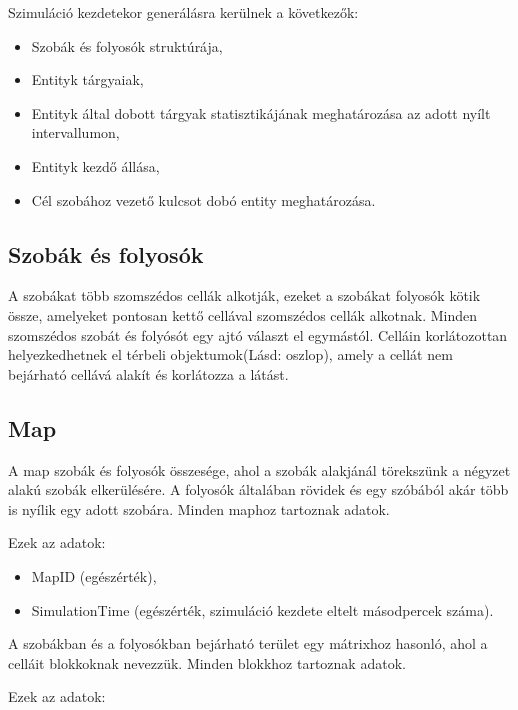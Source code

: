 Szimuláció kezdetekor generálásra kerülnek a következők:

\begin{itemize}
    \item Szobák és folyosók struktúrája,
    \item Entityk tárgyaiak,
    \item Entityk által dobott tárgyak statisztikájának meghatározása az adott nyílt intervallumon,
    \item Entityk kezdő állása,
    \item Cél szobához vezető kulcsot dobó entity meghatározása.
\end{itemize}

\subsection{Szobák és folyosók}

A szobákat több szomszédos cellák alkotják, ezeket a szobákat folyosók kötik össze, amelyeket pontosan kettő cellával szomszédos cellák alkotnak.
Minden szomszédos szobát és folyósót egy ajtó választ el egymástól.
Celláin korlátozottan helyezkedhetnek el térbeli objektumok(Lásd: oszlop), amely a cellát nem bejárható cellává alakít és korlátozza a látást.

\subsection{Map}

A map szobák és folyosók összesége, ahol a szobák alakjánál törekszünk a négyzet alakú szobák elkerülésére. A folyosók általában rövidek és egy szóbából akár több is nyílik egy adott szobára.
Minden maphoz tartoznak adatok.

\noindent Ezek az adatok:

\begin{itemize}
    \item MapID (egészérték),
    \item SimulationTime (egészérték, szimuláció kezdete eltelt másodpercek száma).
\end{itemize}

A szobákban és a folyosókban bejárható terület egy mátrixhoz hasonló, ahol a celláit blokkoknak nevezzük.
Minden blokkhoz tartoznak adatok.

\noindent Ezek az adatok:

